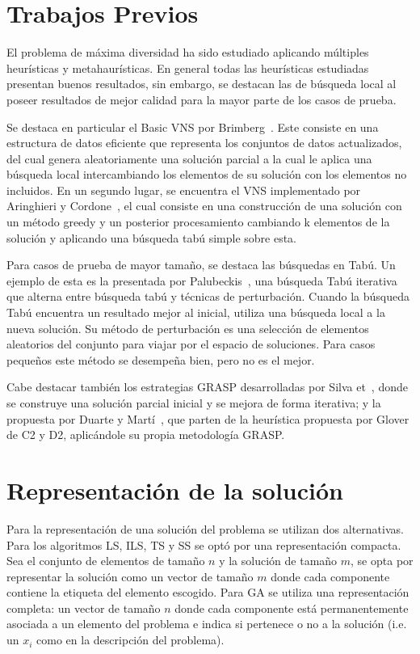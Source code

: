 \documentclass{ci5652}
\begin{document}
\section{Trabajos Previos}
El problema de máxima diversidad ha sido estudiado aplicando múltiples heurísticas y metahaurísticas. En general todas las heurísticas estudiadas presentan buenos resultados, sin embargo, se destacan las de búsqueda local al poseer resultados de mejor calidad para la mayor parte de los casos de prueba.

Se destaca en particular el Basic VNS por Brimberg~\cite{vnsbrimberg}. Este consiste en una estructura de datos eficiente que representa los conjuntos de datos actualizados, del cual genera aleatoriamente una solución parcial a la cual le aplica una búsqueda local intercambiando los elementos de su solución con los elementos no incluidos.
En un segundo lugar, se encuentra el VNS implementado por Aringhieri y Cordone~\cite{vnsarincor}, el cual consiste en una construcción de una solución con un método greedy y un posterior procesamiento cambiando k elementos de la solución y aplicando una búsqueda tabú simple sobre esta.

Para casos de prueba de mayor tamaño, se destaca las búsquedas en Tabú. Un ejemplo de esta es la presentada por Palubeckis~\cite{palubeckis}, una búsqueda Tabú iterativa que alterna entre búsqueda tabú y técnicas de perturbación. Cuando la búsqueda Tabú encuentra un resultado mejor al inicial, utiliza una búsqueda local a la nueva solución. Su método de perturbación es una selección de elementos aleatorios del conjunto para viajar por el espacio de soluciones. Para casos pequeños este método se desempeña bien, pero no es el mejor.

Cabe destacar también los estrategias GRASP desarrolladas por Silva et~\cite{silva}, donde se construye una solución parcial inicial y se mejora de forma iterativa; y la propuesta por Duarte y Martí~\cite{duarmar}, que parten de la heurística propuesta por Glover de C2 y D2, aplicándole su propia metodología GRASP.

\section{Representación de la solución}
Para la representación de una solución del problema se utilizan dos alternativas. Para los algoritmos LS, ILS, TS y SS se optó por una representación compacta.
Sea el conjunto de elementos de tamaño $n$ y la solución de tamaño $m$, se opta por representar la solución como un vector de tamaño $m$ donde cada componente contiene la etiqueta del elemento escogido. Para GA se utiliza una representación completa: un vector de tamaño $n$ donde cada componente está permanentemente asociada a un elemento del problema e indica si pertenece o no a la solución (i.e. un $x_i$ como en la descripción del problema).
\end{document}
